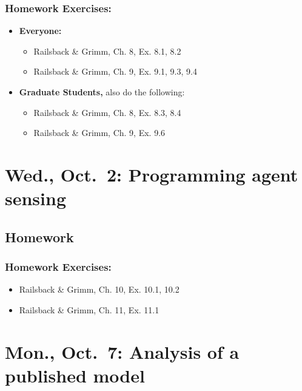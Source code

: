 \documentclass[
]{article}
\providecommand{\tightlist}{%
  \setlength{\itemsep}{0pt}\setlength{\parskip}{0pt}}
\begin{document}
\subsubsection{Homework Exercises:}\label{homework-exercises-7}

\begin{itemize}
\item
  \textbf{Everyone:}

  \begin{itemize}
  \tightlist
  \item
    Railsback \& Grimm, Ch. 8, Ex. 8.1, 8.2
  \item
    Railsback \& Grimm, Ch. 9, Ex. 9.1, 9.3, 9.4
  \end{itemize}
\item
  \textbf{Graduate Students,} also do the following:

  \begin{itemize}
  \tightlist
  \item
    Railsback \& Grimm, Ch. 8, Ex. 8.3, 8.4
  \item
    Railsback \& Grimm, Ch. 9, Ex. 9.6
  \end{itemize}
\end{itemize}

\section{Wed., Oct.~2: Programming agent
sensing}\label{wed.-oct.-2-programming-agent-sensing}

\subsection{Homework}\label{homework-8}

\subsubsection{Homework Exercises:}\label{homework-exercises-8}

\begin{itemize}
\tightlist
\item
  Railsback \& Grimm, Ch. 10, Ex. 10.1, 10.2
\item
  Railsback \& Grimm, Ch. 11, Ex. 11.1
\end{itemize}

\section{Mon., Oct.~7: Analysis of a published
model}\label{mon.-oct.-7-analysis-of-a-published-model}
\end{document}
